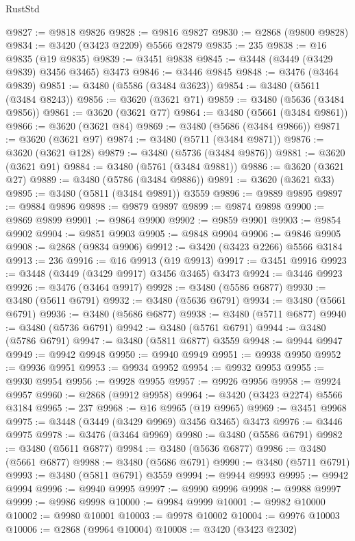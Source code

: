 \begin{lexlean}{RustStd}
\begin{coremodule}
{{{{{{{{{{{{{{{{{{{@9827 := @9818 @9826
@9828 := @9816 @9827
@9830 := @2868 (@9800 @9828)
@9834 := @3420 (@3423 @2209) @5566 @2879
@9835 := 235
@9838 := @16 @9835 (@19 @9835)
@9839 := @3451 @9838
@9845 := @3448 (@3449 (@3429 @9839) @3456 @3465) @3473
@9846 := @3446 @9845
@9848 := @3476 (@3464 @9839)
@9851 := @3480 (@5586 (@3484 @3623))
@9854 := @3480 (@5611 (@3484 @8243))
@9856 := @3620 (@3621 @71)
@9859 := @3480 (@5636 (@3484 @9856))
@9861 := @3620 (@3621 @77)
@9864 := @3480 (@5661 (@3484 @9861))
@9866 := @3620 (@3621 @84)
@9869 := @3480 (@5686 (@3484 @9866))
@9871 := @3620 (@3621 @97)
@9874 := @3480 (@5711 (@3484 @9871))
@9876 := @3620 (@3621 @128)
@9879 := @3480 (@5736 (@3484 @9876))
@9881 := @3620 (@3621 @91)
@9884 := @3480 (@5761 (@3484 @9881))
@9886 := @3620 (@3621 @27)
@9889 := @3480 (@5786 (@3484 @9886))
@9891 := @3620 (@3621 @33)
@9895 := @3480 (@5811 (@3484 @9891)) @3559
@9896 := @9889 @9895
@9897 := @9884 @9896
@9898 := @9879 @9897
@9899 := @9874 @9898
@9900 := @9869 @9899
@9901 := @9864 @9900
@9902 := @9859 @9901
@9903 := @9854 @9902
@9904 := @9851 @9903
@9905 := @9848 @9904
@9906 := @9846 @9905
@9908 := @2868 (@9834 @9906)
@9912 := @3420 (@3423 @2266) @5566 @3184
@9913 := 236
@9916 := @16 @9913 (@19 @9913)
@9917 := @3451 @9916
@9923 := @3448 (@3449 (@3429 @9917) @3456 @3465) @3473
@9924 := @3446 @9923
@9926 := @3476 (@3464 @9917)
@9928 := @3480 (@5586 @6877)
@9930 := @3480 (@5611 @6791)
@9932 := @3480 (@5636 @6791)
@9934 := @3480 (@5661 @6791)
@9936 := @3480 (@5686 @6877)
@9938 := @3480 (@5711 @6877)
@9940 := @3480 (@5736 @6791)
@9942 := @3480 (@5761 @6791)
@9944 := @3480 (@5786 @6791)
@9947 := @3480 (@5811 @6877) @3559
@9948 := @9944 @9947
@9949 := @9942 @9948
@9950 := @9940 @9949
@9951 := @9938 @9950
@9952 := @9936 @9951
@9953 := @9934 @9952
@9954 := @9932 @9953
@9955 := @9930 @9954
@9956 := @9928 @9955
@9957 := @9926 @9956
@9958 := @9924 @9957
@9960 := @2868 (@9912 @9958)
@9964 := @3420 (@3423 @2274) @5566 @3184
@9965 := 237
@9968 := @16 @9965 (@19 @9965)
@9969 := @3451 @9968
@9975 := @3448 (@3449 (@3429 @9969) @3456 @3465) @3473
@9976 := @3446 @9975
@9978 := @3476 (@3464 @9969)
@9980 := @3480 (@5586 @6791)
@9982 := @3480 (@5611 @6877)
@9984 := @3480 (@5636 @6877)
@9986 := @3480 (@5661 @6877)
@9988 := @3480 (@5686 @6791)
@9990 := @3480 (@5711 @6791)
@9993 := @3480 (@5811 @6791) @3559
@9994 := @9944 @9993
@9995 := @9942 @9994
@9996 := @9940 @9995
@9997 := @9990 @9996
@9998 := @9988 @9997
@9999 := @9986 @9998
@10000 := @9984 @9999
@10001 := @9982 @10000
@10002 := @9980 @10001
@10003 := @9978 @10002
@10004 := @9976 @10003
@10006 := @2868 (@9964 @10004)
@10008 := @3420 (@3423 @2302)
}}}}}}}}}}}}}}}}}}}
\end{coremodule}
\end{lexlean}
